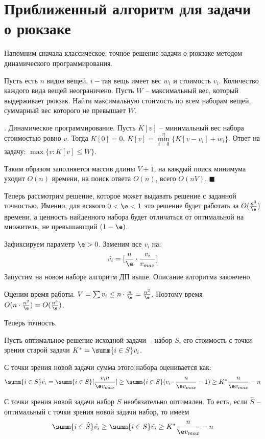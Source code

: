 \section{Приближенный алгоритм для задачи о рюкзаке} 
Напомним сначала классическое, точное решение задачи о рюкзаке методом динамического программирования.

 Пусть есть $n$ видов вещей, $i-$тая вещь имеет вес $w_i$ и стоимость $v_i$. Количество каждого вида вещей неограничено. Пусть $W$ -- максимальный вес, который выдерживает рюкзак. Найти максимальную стоимость по всем наборам вещей, суммарный вес которого не превышает $W$.

. Динамическое программирование. Пусть $K[v]$ -- минимальный вес набора стоимостью ровно $v$. Тогда $K[0] = 0$, $K[v] = \underset{i=0}{\overset{n}{\min}} \{K[v-v_i] + w_i\}$. Ответ на задачу: $\max\{v : K[v] \leq W\}$. 

Таким образом заполняется массив длины $V+1$, на каждый поиск минимума уходит $O(n)$ времени, на поиск ответа $O(n)$, всего $O(nV)$.  $\blacksquare$

Теперь рассмотрим решение, которое может выдавать решение с заданной точностью. Именно, для всякого $0 < \e < 1$ это решение будет работать за $O(\frac{n^3}{\e})$ времени, а ценность найденного набора будет отличаться от оптимальной на множитель, не превышающий $(1-\e)$.


Зафиксируем параметр $\e>0$. Заменим все $v_i$ на: $$\hat{v_i} = [\frac{n}{\e} \cdot \frac{v_i}{v_{max}}]$$ Запустим на новом наборе алгоритм ДП выше. Описание алгоритма закончено.

Оценим время работы. $V = \sum v_i \leq n\cdot \frac{n}{\e} = \frac{n^2}{\e}$. Поэтому время $O(n \cdot \frac{n^2}{\e}) = O(\frac{n^3}{\e})$.

Теперь точность. 

Пусть оптимальное решение исходной задачи -- набор $S$, его стоимость с точки зрения старой задачи $K^* = \summ{i\in S} v_i$. 

С точки зрения новой задачи сумма этого набора оценивается как: 
$$\summ{i\in S}\hat{v_i} = \summ{i\in S} [\frac{v_i n}{\e v_{max}}] \geq \summ{i\in S} (v_i \cdot \frac{n}{\e v_{max}} - 1) \geq K^*\frac{n}{\e v_{max}} - n$$

С точки зрения новой задачи набор $S$ необязательно оптимален. То есть, если $\hat{S}$ -- оптимальный с точки зрения новой задачи набор, то имеем $$\summ{i\in\hat S}\hat{v_i} \geq \summ{i\in S} \hat{v_i} \geq K^*\frac{n}{\e v_{max}} - n$$

